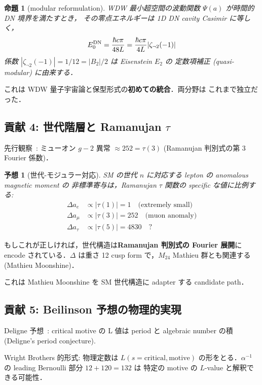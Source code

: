 \documentclass[11pt,a4paper]{article}
\newtheorem{conjecture}{予想}
\newtheorem{proposition}{命題}
\begin{document}
\begin{proposition}[modular reformulation]
WDW 最小超空間の波動関数 $\Psi(a)$ が時間的 DN 境界を満たすとき，
その零点エネルギーは 1D DN cavity Casimir に等しく，
\begin{equation}
E_0^{\rm DN} = \frac{\hbar c \pi}{48 L} = \frac{\hbar c \pi}{4L}|\zeta_{\neg 2}(-1)|
\end{equation}
係数 $|\zeta_{\neg 2}(-1)| = 1/12 = |B_2|/2$ は Eisenstein $E_2$ の
定数項補正 (quasi-modular) に由来する．
\end{proposition}

これは WDW 量子宇宙論と保型形式の\textbf{初めての統合}．両分野は
これまで独立だった．

\subsection{貢献 4: 世代階層と Ramanujan $\tau$}

先行観察~\cite{wb-spec-z}: ミューオン $g-2$ 異常 $\approx 252 = \tau(3)$
(Ramanujan 判別式の第 3 Fourier 係数)．

\begin{conjecture}[世代-モジュラー対応]
SM の世代 $n$ に対応する lepton の anomalous magnetic moment の
非標準寄与は，Ramanujan $\tau$ 関数の specific な値に比例する:
\begin{align}
\Delta a_e &\propto |\tau(1)| = 1 \quad\text{(extremely small)}\\
\Delta a_\mu &\propto |\tau(3)| = 252 \quad\text{(muon anomaly)}\\
\Delta a_\tau &\propto |\tau(5)| = 4830 \quad\text{?}
\end{align}
\end{conjecture}

もしこれが正しければ，世代構造は\textbf{Ramanujan 判別式の Fourier 展開}に
encode されている．$\Delta$ は重さ 12 cusp form で，$M_{24}$ Mathieu
群とも関連する (Mathieu Moonshine)．

これは Mathieu Moonshine を SM 世代構造に adapter する candidate path．

\subsection{貢献 5: Beilinson 予想の物理的実現}

Deligne 予想~\cite{Deligne1979}: critical motive の L 値は period と
algebraic number の積 (Deligne's period conjecture).

Wright Brothers 的形式: 物理定数は $L(s=\text{critical}, \text{motive})$
の形をとる．$\alpha^{-1}$ の leading Bernoulli 部分 $12 + 120 = 132$ は
特定の motive の $L$-value と解釈できる可能性．
\end{document}

